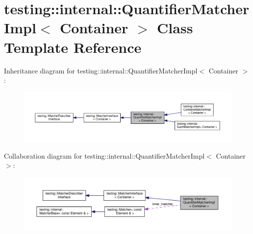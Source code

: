 \hypertarget{classtesting_1_1internal_1_1QuantifierMatcherImpl}{}\section{testing\+:\+:internal\+:\+:Quantifier\+Matcher\+Impl$<$ Container $>$ Class Template Reference}
\label{classtesting_1_1internal_1_1QuantifierMatcherImpl}


Inheritance diagram for testing\+:\+:internal\+:\+:Quantifier\+Matcher\+Impl$<$ Container $>$\+:\nopagebreak
\begin{figure}[H]
\begin{center}
\leavevmode
\includegraphics[width=350pt]{classtesting_1_1internal_1_1QuantifierMatcherImpl__inherit__graph}
\end{center}
\end{figure}


Collaboration diagram for testing\+:\+:internal\+:\+:Quantifier\+Matcher\+Impl$<$ Container $>$\+:\nopagebreak
\begin{figure}[H]
\begin{center}
\leavevmode
\includegraphics[width=350pt]{classtesting_1_1internal_1_1QuantifierMatcherImpl__coll__graph}
\end{center}
\end{figure}
